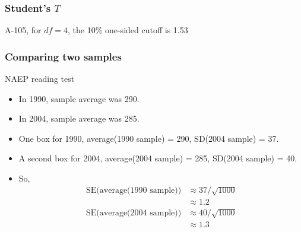 \documentclass[handout]{beamer}
\begin{document}
   \begin{frame}
   \frametitle{Student's $T$}
   \begin{center}
   \end{center}
   A-105, for $df=4$, the 10\% one-sided cutoff is 1.53
   \end{frame}


   \begin{frame} \frametitle{Comparing two samples}

   \begin{block}
   {NAEP reading test}
   \begin{itemize}
   \item In 1990, sample average was 290.

   \item In 2004, sample average was 285.

   \item One box for 1990, average(1990 sample) = 290, SD(2004 sample) = 37.

   \item A second box for 2004, average(2004 sample) = 285, SD(2004 sample) = 40.

   \item So,
   $$
   \begin{aligned}
   \text{SE(average(1990 sample))} &\approx 37 / \sqrt{1000} \\
    &\approx 1.2\\
   \text{SE(average(2004 sample))} &\approx 40 / \sqrt{1000} \\
   &\approx 1.3\\
   \end{aligned}
   $$

   \end{itemize}
   \end{block}
   \end{frame}

\end{document}
